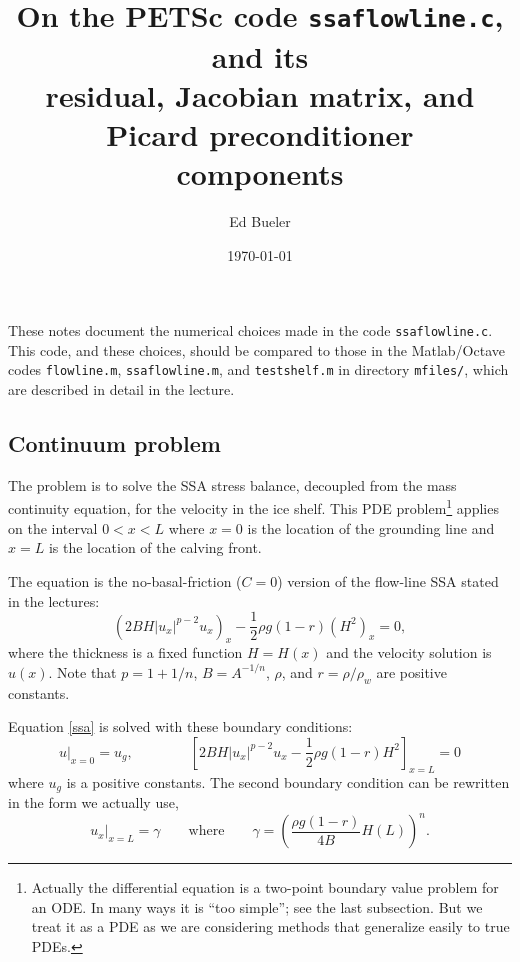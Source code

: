 \documentclass[11pt,final,reqno]{amsart}
\begin{document}
\title[On the PETSc code \texttt{ssaflowline.c}]{On the PETSc code \texttt{ssaflowline.c}, and its \\ residual, Jacobian matrix, and Picard preconditioner \\ components}
\author{Ed Bueler}
\date{\today}
\maketitle

These notes document the numerical choices made in the code \texttt{ssaflowline.c}.  This code, and these choices, should be compared to those in the Matlab/Octave codes \texttt{flowline.m}, \texttt{ssaflowline.m}, and \texttt{testshelf.m} in directory \texttt{mfiles/}, which are described in detail in the lecture.

\subsection*{Continuum problem}   The problem is to solve the SSA stress balance, decoupled from the mass continuity equation, for the velocity in the ice shelf.  This PDE problem\footnote{Actually the differential equation is a two-point boundary value problem for an ODE.  In many ways it is ``too simple''; see the last subsection.  But we treat it as a PDE as we are considering methods that generalize easily to true PDEs.} applies on the interval $0<x<L$ where $x=0$ is the location of the grounding line and $x=L$ is the location of the calving front.

The equation is the no-basal-friction ($C=0$) version of the flow-line SSA stated in the lectures:
\begin{equation}
  \left(2 B H |u_x|^{p-2} u_x\right)_x - \frac{1}{2} \rho g (1-r) \left(H^2\right)_x = 0,  \label{ssa}
\end{equation}
where the thickness is a fixed function $H=H(x)$ and the velocity solution is $u(x)$.  Note that $p=1+1/n$, $B=A^{-1/n}$, $\rho$, and $r=\rho/\rho_w$ are positive constants.  

Equation \eqref{ssa} is solved with these boundary conditions:
\begin{equation}
u\big|_{x=0} = u_g, \qquad\qquad \left[2 B H |u_x|^{p-2} u_x - \frac{1}{2}\rho g (1-r) H^2\right]_{x=L} = 0
\end{equation}
where $u_g$ is a positive constants.  The second boundary condition can be rewritten in the form we actually use,
\begin{equation}
u_x\big|_{x=L} = \gamma \qquad \text{where} \qquad \gamma = \left(\frac{\rho g (1-r)}{4B} H(L)\right)^n. \tag{2b} \label{neumann}
\end{equation}
\end{document}
